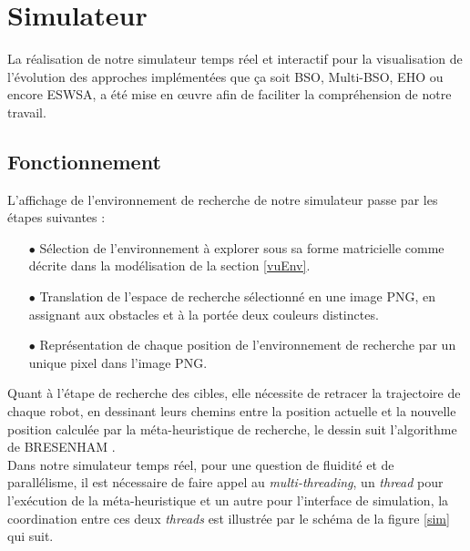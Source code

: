 	
	
	
	
	\section{Simulateur}
	La réalisation de notre simulateur temps réel et interactif pour la visualisation de l'évolution des approches implémentées que ça soit BSO, Multi-BSO, EHO ou encore ESWSA, a été mise en œuvre afin de faciliter la compréhension de notre travail.
	
	\subsection{Fonctionnement}
	\noindent
	L'affichage de l'environnement de recherche de notre simulateur passe par les étapes suivantes :
	\begin{itemize}
		\item[$\bullet$] Sélection de l'environnement à explorer sous sa forme matricielle comme décrite dans la modélisation de la section \ref{vuEnv}.
		
		\item[$\bullet$] Translation de l'espace de recherche sélectionné en une image PNG, en assignant aux obstacles et à la portée deux couleurs distinctes.
		
		\item[$\bullet$] Représentation de chaque position de l'environnement de recherche par un unique pixel dans l'image PNG.\\
	\end{itemize}
	
	Quant à l'étape de recherche des cibles, elle nécessite de retracer la trajectoire de chaque robot, en dessinant leurs chemins entre la position actuelle et la nouvelle position calculée par la méta-heuristique de recherche, le dessin suit l'algorithme de BRESENHAM \cite{line}. \\
	
	Dans notre simulateur temps réel, pour une question de fluidité et de parallélisme, il est nécessaire de faire appel au \textit{multi-threading}, un \textit{thread} pour l'exécution de la méta-heuristique et un autre pour l'interface de simulation, la coordination entre ces deux \textit{threads} est illustrée par le schéma de la figure \ref{sim} qui suit.

